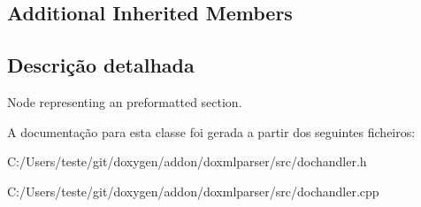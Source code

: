 \subsection*{Additional Inherited Members}


\subsection{Descrição detalhada}
Node representing an preformatted section. 

A documentação para esta classe foi gerada a partir dos seguintes ficheiros\-:\begin{DoxyCompactItemize}
\item 
C\-:/\-Users/teste/git/doxygen/addon/doxmlparser/src/dochandler.\-h\item 
C\-:/\-Users/teste/git/doxygen/addon/doxmlparser/src/dochandler.\-cpp\end{DoxyCompactItemize}
